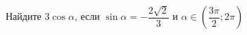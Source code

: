 \begin{ex}
	\begin{condition}
		Найдите \( 3\cos\alpha \), если \( \sin\alpha=-\dfrac{2\sqrt{2}}{3} \) и \( \alpha\in\left( \dfrac{3\pi}{2};2\pi \right) \)
	\end{condition}
\end{ex}